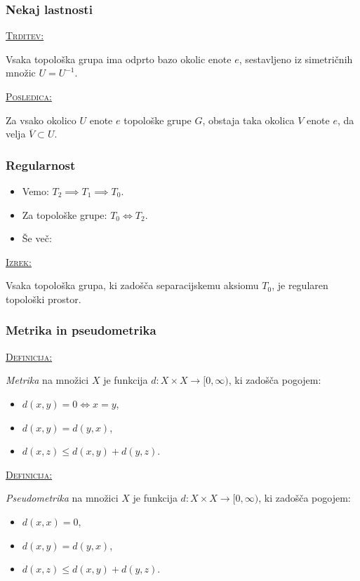\documentclass[a4paper, 12pt]{beamer}
\newenvironment{matematika}[1]{
\textcolor{bostonuniversityred}{\underline{\textsc{#1:}}}
}{
}
\begin{document}
\begin{frame}
\frametitle{Nekaj lastnosti}
\begin{matematika}{Trditev}
Vsaka topološka grupa ima odprto bazo okolic enote $e$, sestavljeno iz simetričnih množic $U = U^{-1}$.
\end{matematika} \newline

\begin{matematika}{Posledica}
Za vsako okolico $U$ enote $e$ topološke grupe $G$, obstaja taka okolica $V$ enote $e$, da velja $\overline{V} \subset U$.
\end{matematika}
\end{frame}

\begin{frame}
\frametitle{Regularnost}
\begin{itemize}[label=]
\item Vemo: $T_2 \implies T_1 \implies T_0$.
\item Za topološke grupe: $T_0 \iff T_2$. \pause
\item Še več:
\end{itemize}

\begin{matematika}{Izrek}
Vsaka topološka grupa, ki zadošča separacijskemu aksiomu $T_0$, je regularen topološki prostor.
\end{matematika}
\end{frame}

\begin{frame}
\frametitle{Metrika in pseudometrika}
\begin{matematika}{Definicija}
	\emph{Metrika} na množici $X$ je funkcija $d: X \times X \to [0,\infty)$, ki zadošča pogojem:
	\begin{itemize}[label=]
		\item $d(x, y) = 0 \iff x = y$,
		\item $d(x, y) = d(y, x)$,
		\item $d(x, z) \leq d(x, y) + d(y, z)$.
	\end{itemize}
\end{matematika}

\pause

\begin{matematika}{Definicija}
	\emph{Pseudometrika} na množici $X$ je funkcija $d: X \times X \to [0,\infty)$, ki zadošča pogojem:
	\begin{itemize}[label=]
		\item $d(x, x) = 0$,
		\item $d(x, y) = d(y, x)$,
		\item $d(x, z) \leq d(x, y) + d(y, z)$.
	\end{itemize}
\end{matematika}
\end{frame}
\end{document}
